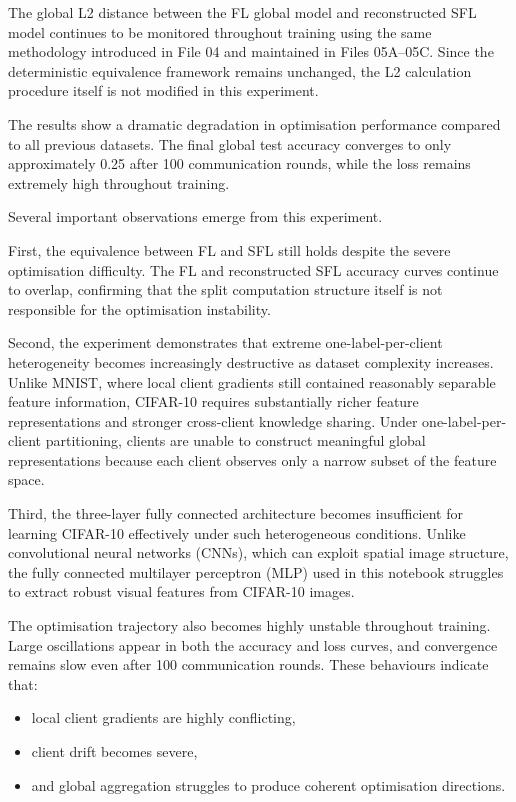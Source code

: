 The global L2 distance between the FL global model and reconstructed SFL model continues to be monitored throughout training using the same methodology introduced in File 04 and maintained in Files 05A--05C. Since the deterministic equivalence framework remains unchanged, the L2 calculation procedure itself is not modified in this experiment.

The results show a dramatic degradation in optimisation performance compared to all previous datasets. The final global test accuracy converges to only approximately 0.25 after 100 communication rounds, while the loss remains extremely high throughout training.

Several important observations emerge from this experiment.

First, the equivalence between FL and SFL still holds despite the severe optimisation difficulty. The FL and reconstructed SFL accuracy curves continue to overlap, confirming that the split computation structure itself is not responsible for the optimisation instability.

Second, the experiment demonstrates that extreme one-label-per-client heterogeneity becomes increasingly destructive as dataset complexity increases. Unlike MNIST, where local client gradients still contained reasonably separable feature information, CIFAR-10 requires substantially richer feature representations and stronger cross-client knowledge sharing. Under one-label-per-client partitioning, clients are unable to construct meaningful global representations because each client observes only a narrow subset of the feature space.

Third, the three-layer fully connected architecture becomes insufficient for learning CIFAR-10 effectively under such heterogeneous conditions. Unlike convolutional neural networks (CNNs), which can exploit spatial image structure, the fully connected multilayer perceptron (MLP) used in this notebook struggles to extract robust visual features from CIFAR-10 images.

The optimisation trajectory also becomes highly unstable throughout training. Large oscillations appear in both the accuracy and loss curves, and convergence remains slow even after 100 communication rounds. These behaviours indicate that:
\begin{itemize}
    \item local client gradients are highly conflicting,
    \item client drift becomes severe,
    \item and global aggregation struggles to produce coherent optimisation directions.
\end{itemize}

